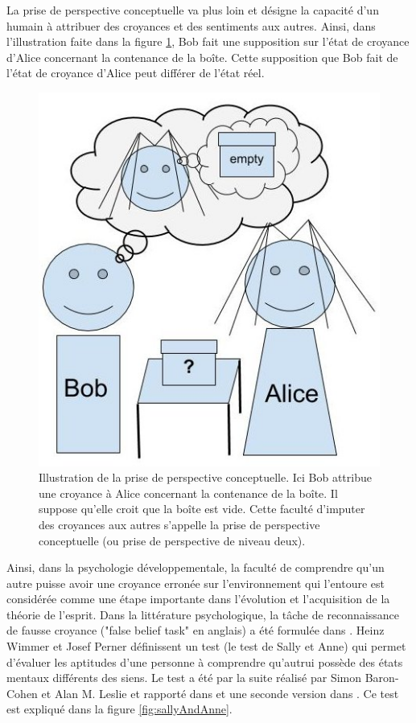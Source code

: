 \documentclass[a4paper,11pt,twoside]{StyleThese}
\begin{document}
La prise de perspective conceptuelle va plus loin et désigne la capacité d'un humain à attribuer des croyances et des sentiments aux autres\cite{Baron1985}.
Ainsi, dans l'illustration faite dans la figure \ref{fig:conceptual}, Bob fait une supposition sur l'état de croyance d'Alice concernant la contenance de la boîte.
Cette supposition que Bob fait de l'état de croyance d'Alice peut différer de l'état réel.

\begin{figure}[ht!]
 \centering
  \includegraphics[width=0.49\linewidth]{./img/conceptual.jpg} 
  \caption {Illustration de la prise de perspective conceptuelle. Ici Bob attribue une croyance à Alice concernant la contenance de la boîte. Il suppose qu'elle croit que la boîte est vide. Cette faculté d'imputer des croyances aux autres s'appelle la prise de perspective conceptuelle (ou prise de perspective de niveau deux).}
  \label{fig:conceptual}
\end{figure}

Ainsi, dans la psychologie développementale, la faculté de comprendre qu'un autre puisse avoir une croyance erronée sur l'environnement qui l'entoure est considérée comme une étape importante dans l'évolution et l'acquisition de la théorie de l'esprit. Dans la littérature psychologique, la tâche de reconnaissance de fausse croyance ("false belief task" en anglais) a été formulée dans \cite{Wimmer1983103}. Heinz Wimmer et Josef Perner définissent un test (le test de Sally et Anne) qui permet d'évaluer les aptitudes d'une personne à comprendre qu'autrui possède des états mentaux différents des siens. Le test a été par la suite réalisé par Simon Baron-Cohen et Alan M. Leslie et rapporté dans \cite{Baron1985} et une seconde version dans \cite{Leslie1988}. Ce test est expliqué dans la figure \ref{fig:sallyAndAnne}.
\end{document}
